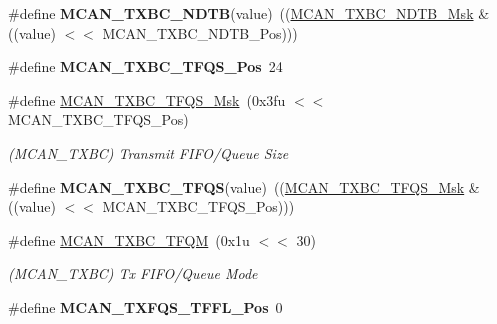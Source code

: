 \begin{DoxyCompactItemize}
\mbox{\label{group__SAMV71__MCAN_ga3ac298b67843468465379413787c1d4e}} 
\#define {\bfseries M\+C\+A\+N\+\_\+\+T\+X\+B\+C\+\_\+\+N\+D\+TB}(value)~((\mbox{\hyperlink{group__SAMV71__MCAN_ga2569c5d6a5ed4392bc1b5d998935c4f5}{M\+C\+A\+N\+\_\+\+T\+X\+B\+C\+\_\+\+N\+D\+T\+B\+\_\+\+Msk}} \& ((value) $<$$<$ M\+C\+A\+N\+\_\+\+T\+X\+B\+C\+\_\+\+N\+D\+T\+B\+\_\+\+Pos)))
\item 
\mbox{\label{group__SAMV71__MCAN_gab3128cb0578a8804d38e9d69ab7e4e85}} 
\#define {\bfseries M\+C\+A\+N\+\_\+\+T\+X\+B\+C\+\_\+\+T\+F\+Q\+S\+\_\+\+Pos}~24
\item 
\mbox{\label{group__SAMV71__MCAN_gaab2c2b69c1c3a6ac21086392b7e1c02c}} 
\#define \mbox{\hyperlink{group__SAMV71__MCAN_gaab2c2b69c1c3a6ac21086392b7e1c02c}{M\+C\+A\+N\+\_\+\+T\+X\+B\+C\+\_\+\+T\+F\+Q\+S\+\_\+\+Msk}}~(0x3fu $<$$<$ M\+C\+A\+N\+\_\+\+T\+X\+B\+C\+\_\+\+T\+F\+Q\+S\+\_\+\+Pos)
\begin{DoxyCompactList}\small\item\em (M\+C\+A\+N\+\_\+\+T\+X\+BC) Transmit F\+I\+F\+O/\+Queue Size \end{DoxyCompactList}\item 
\mbox{\label{group__SAMV71__MCAN_ga08f3048d926d83d1e85c5132947faf71}} 
\#define {\bfseries M\+C\+A\+N\+\_\+\+T\+X\+B\+C\+\_\+\+T\+F\+QS}(value)~((\mbox{\hyperlink{group__SAMV71__MCAN_gaab2c2b69c1c3a6ac21086392b7e1c02c}{M\+C\+A\+N\+\_\+\+T\+X\+B\+C\+\_\+\+T\+F\+Q\+S\+\_\+\+Msk}} \& ((value) $<$$<$ M\+C\+A\+N\+\_\+\+T\+X\+B\+C\+\_\+\+T\+F\+Q\+S\+\_\+\+Pos)))
\item 
\mbox{\label{group__SAMV71__MCAN_gae4323316f39295b320e432af610c794b}} 
\#define \mbox{\hyperlink{group__SAMV71__MCAN_gae4323316f39295b320e432af610c794b}{M\+C\+A\+N\+\_\+\+T\+X\+B\+C\+\_\+\+T\+F\+QM}}~(0x1u $<$$<$ 30)
\begin{DoxyCompactList}\small\item\em (M\+C\+A\+N\+\_\+\+T\+X\+BC) Tx F\+I\+F\+O/\+Queue Mode \end{DoxyCompactList}\item 
\mbox{\label{group__SAMV71__MCAN_ga7c26fd82c1e5dee8056bf649e6354450}} 
\#define {\bfseries M\+C\+A\+N\+\_\+\+T\+X\+F\+Q\+S\+\_\+\+T\+F\+F\+L\+\_\+\+Pos}~0

\end{DoxyCompactItemize}
